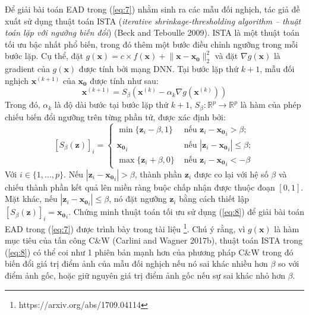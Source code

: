 Để giải bài toán EAD trong (\ref{eq:7}) nhằm sinh ra các mẫu đối nghịch, tác giả đề
xuất sử dụng thuật toán ISTA (\textit{iterative shrinkage-thresholding algorithm – thuật toán lặp 
với ngưỡng biến đổi}) (Beck and Teboulle 2009). ISTA là một thuật toán tối ưu bậc nhất
phổ biến, trong đó thêm một bước điều chỉnh ngưỡng trong mỗi bước lặp. Cụ thể, 
đặt $g(\mathbf{x}) = c \times f(\mathbf{x}) + \lVert \mathbf{x} - \mathbf{x_0} \rVert_2^2$
và đặt $\nabla g(\mathbf{x})$ là gradient của $g(\mathbf{x})$ được tính bởi mạng DNN. 
Tại bước lặp thứ $k+1$, mẫu đối nghịch $\mathbf{x}^{(k+1)}$ của $\mathbf{x_0}$ được tính 
như sau:
\begin{equation}
    \label{eq:8}
    \mathbf{x}^{(k+1)} = S_{\beta} (\mathbf{x}^{(k)} - \alpha_k \nabla g(\mathbf{x}^{(k)}))
\end{equation}
Trong đó, $\alpha_k$ là độ dài bước tại bước lặp thứ $k+1$, $S_{\beta} : \mathbb{R}^p \to 
\mathbb{R}^p$ là hàm của phép chiếu biến đổi ngưỡng trên từng phần tử, được xác định bởi:
\begin{equation}
    \label{eq:9}
    [S_{\beta}(\mathbf{z})]_i = 
    \begin{cases}
        \min \{ \mathbf{z}_i - \beta, 1 \} &\text{ nếu } \mathbf{z}_i - \mathbf{x_0}_i  > \beta; \\
        \mathbf{x_0}_i &\text{ nếu } |\mathbf{z}_i - \mathbf{x_0}_i| \leq \beta; \\
        \max \{ \mathbf{z}_i + \beta, 0 \} &\text{ nếu } \mathbf{z}_i - \mathbf{x_0}_i < -\beta
    \end{cases}
\end{equation}
Với $i \in \{ 1, ..., p \}$. Nếu $|\mathbf{z}_i - \mathbf{x_0}_i| > \beta$, thành phần 
$\mathbf{z}_i$ được co lại với hệ số $\beta$ và chiếu thành phần kết quả lên miền ràng buộc 
chấp nhận được thuộc đoạn $[0,1]$. Mặt khác, nếu $|\mathbf{z}_i - \mathbf{x_0}_i| \leq \beta$, nó đặt ngưỡng $\mathbf{z}_i$ bằng cách thiết lập $[S_{\beta}(\mathbf{z})]_i = \mathbf{x_0}_i$.
Chứng minh thuật toán tối ưu sử dụng (\ref{eq:8}) để giải bài toán EAD trong (\ref{eq:7})
được trình bày trong tài liệu \footnote{https://arxiv.org/abs/1709.04114}. Chú ý rằng, vì $g(\mathbf{x})$ là hàm mục tiêu của tấn công C\&W (Carlini and Wagner 2017b), thuật toán ISTA trong (\ref{eq:8}) có thể coi như 1 phiên bản mạnh hơn của phương pháp C\&W trong đó biến đổi giá trị điểm ảnh của mẫu đối nghịch nếu nó sai khác nhiều hơn $\beta$ so với điểm ảnh gốc, hoặc giữ nguyên giá trị điểm ảnh gốc nếu sự sai khác nhỏ hơn $\beta$.

